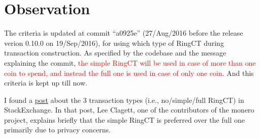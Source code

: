 \documentclass[a4paper,10pt]{article}
\begin{document}
\section{Observation}
The criteria is updated at commit ``a0925e'' (27/Aug/2016 before the release verion 0.10.0 on 19/Sep/2016), for using which type of RingCT during transaction construction. As specified by the codebase and the message explaining the commit, \textcolor{red}{the simple RingCT will be used in case of more than one coin to spend, and instead the full one is used in case of only one coin}. And this criteria is kept up till now.\par
I found a \href{https://monero.stackexchange.com/questions/3348/what-are-3-types-of-ring-ct-transactions}{post} about the 3 transaction types (i.e., no/simple/full RingCT) in StackExchange. In that post, Lee Clagett, one of the contributors of the monero project, explains briefly that the simple RingCT is preferred over the full one primarily due to privacy concerns. 
\end{document}
